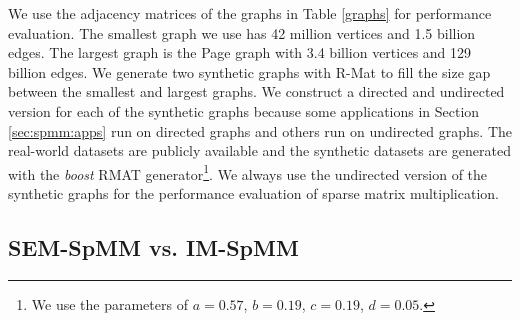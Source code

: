 We use the adjacency matrices of the graphs in Table \ref{graphs} for performance
evaluation. The smallest graph we use has 42 million vertices and 1.5 billion
edges. The largest graph is the Page graph with 3.4 billion vertices and 129
billion edges. We generate two synthetic graphs with R-Mat \cite{rmat} to fill
the size gap between the smallest and largest graphs. We construct a directed and
undirected version for each of the synthetic graphs because some applications
in Section \ref{sec:spmm:apps} run on directed graphs and others run on undirected
graphs. The real-world datasets are publicly available and the synthetic
datasets are generated with the \textit{boost} RMAT generator\footnote{We use the 
parameters of $a=0.57$, $b=0.19$, $c=0.19$,
$d=0.05$.}. We always use the undirected version of the synthetic graphs for
the performance evaluation of sparse matrix multiplication.

\subsection{SEM-SpMM vs. IM-SpMM}

